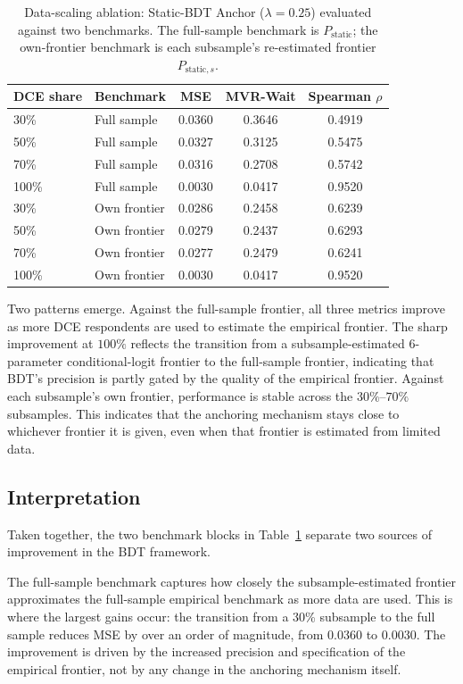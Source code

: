 \documentclass[11pt]{article}
\begin{document}
\begin{table}[htbp]
\centering
\caption{Data-scaling ablation: Static-BDT Anchor (\(\lambda = 0.25\)) evaluated against two benchmarks. The full-sample benchmark is \(P_{\mathrm{static}}\); the own-frontier benchmark is each subsample's re-estimated frontier \(P_{\mathrm{static},s}\).}
\label{tab:data_scaling_benchmarks}
\begin{tabular}{llccc}
\toprule
DCE share & Benchmark & MSE & MVR-Wait & Spearman \(\rho\) \\
\midrule
30\% & Full sample & 0.0360 & 0.3646 & 0.4919 \\
50\% & Full sample & 0.0327 & 0.3125 & 0.5475 \\
70\% & Full sample & 0.0316 & 0.2708 & 0.5742 \\
100\% & Full sample & 0.0030 & 0.0417 & 0.9520 \\
\midrule
30\% & Own frontier & 0.0286 & 0.2458 & 0.6239 \\
50\% & Own frontier & 0.0279 & 0.2437 & 0.6293 \\
70\% & Own frontier & 0.0277 & 0.2479 & 0.6241 \\
100\% & Own frontier & 0.0030 & 0.0417 & 0.9520 \\
\bottomrule
\end{tabular}
\end{table}

Two patterns emerge. Against the full-sample frontier, all three metrics improve as more DCE respondents are used to estimate the empirical frontier. The sharp improvement at $100\%$ reflects the transition from a subsample-estimated 6-parameter conditional-logit frontier to the full-sample frontier, indicating that BDT's precision is partly gated by the quality of the empirical frontier. Against each subsample's own frontier, performance is stable across the $30\%$--$70\%$ subsamples. This indicates that the anchoring mechanism stays close to whichever frontier it is given, even when that frontier is estimated from limited data.

\subsection{Interpretation}
\label{app:interpretation}

Taken together, the two benchmark blocks in Table~\ref{tab:data_scaling_benchmarks} separate two sources of improvement in the BDT framework.

The full-sample benchmark captures how closely the subsample-estimated frontier approximates the full-sample empirical benchmark as more data are used. This is where the largest gains occur: the transition from a 30\% subsample to the full sample reduces MSE by over an order of magnitude, from 0.0360 to 0.0030. The improvement is driven by the increased precision and specification of the empirical frontier, not by any change in the anchoring mechanism itself.
\end{document}
